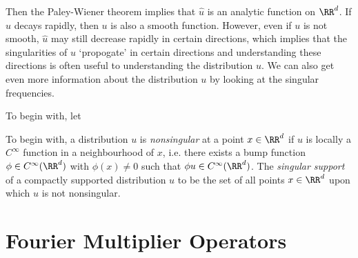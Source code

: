 Then the Paley-Wiener theorem implies that $\widehat{u}$ is an analytic function on $\RR^d$. If $\widehat{u}$ decays rapidly, then $u$ is also a smooth function. However, even if $u$ is not smooth, $\widehat{u}$ may still decrease rapidly in certain directions, which implies that the singularities of $u$ `propogate' in certain directions and understanding these directions is often useful to understanding the distribution $u$. We can also get even more information about the distribution $u$ by looking at the singular frequencies.

To begin with, let 

To begin with, a distribution $u$ is \emph{nonsingular} at a point $x \in \RR^d$ if $u$ is locally a $C^\infty$ function in a neighbourhood of $x$, i.e. there exists a bump function $\phi \in C^\infty(\RR^d)$ with $\phi(x) \neq 0$ such that $\phi u \in C^\infty(\RR^d)$. The  \emph{singular support} of a compactly supported distribution $u$ to be the set of all points $x \in \RR^d$ upon which $u$ is not nonsingular.









\chapter{Fourier Multiplier Operators}

